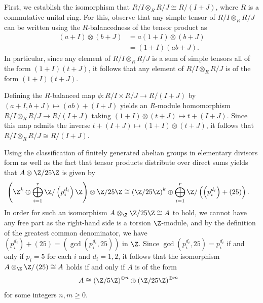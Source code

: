 \documentclass[10pt]{mypackage}
\begin{document}
\begin{solution}
  First, we establish the isomorphism that $R/I\otimes_{R}R/J\cong R/\left( I + J \right)$, where $R$ is a commutative unital ring. For this, observe that any simple tensor of $R/I\otimes_R R/J$ can be written using the $R$-balancedness of the tensor product as
  \begin{align*}
    \left( a + I \right)\otimes \left( b + J \right) &= a\left( 1 + I \right)\otimes \left( b + J \right)\\
                                                     &= \left( 1 + I \right)\left( ab + J \right).
  \end{align*}
  In particular, since any element of $R/I\otimes_{R}R/J$ is a sum of simple tensors all of the form $\left( 1 + I \right)\left( t + J \right)$, it follows that any element of $R/I\otimes_{R}R/J$ is of the form $\left( 1 + I \right)\left( t + J \right)$.

  Defining the $R$-balanced map $\phi\colon R/I\times R/J\rightarrow R/\left(  I +J \right)$ by $\left( a + I,b+J \right)\mapsto \left( ab \right) + \left( I+J \right)$ yields an $R$-module homomorphism $R/I\otimes_{R}R/J\rightarrow R/\left( I + J \right)$ taking $\left( 1 + I \right)\otimes \left( t + J \right)\mapsto t + \left( I+J \right)$. Since this map admits the inverse $t + \left(  I +J \right)\mapsto \left( 1+I \right)\otimes \left( t + J \right)$, it follows that $R/I\otimes_{R}R/J\cong R/\left( I + J \right)$.

  Using the classification of finitely generated abelian groups in elementary divisors form as well as the fact that tensor products distribute over direct sums yields that $A\otimes \Z/25\Z$ is given by
  \begin{align*}
    \left( \Z^{k}\oplus \bigoplus_{i=1}^{r}\Z/\left( p_i^{d_i} \right)\Z \right)\otimes \Z/25\Z &\cong \left( \Z/25\Z \right)^{k} \oplus \bigoplus_{i=1}^{r} \Z/\left( \left( p_i^{d_i} \right) + \left( 25 \right) \right).
  \end{align*}
  In order for such an isomorphism $A\otimes_{\Z}\Z/25\Z\cong A$ to hold, we cannot have any free part as the right-hand side is a torsion $\Z$-module, and by the definition of the greatest common denominator, we have $\left( p_i^{d_i} \right) + \left( 25 \right) = \left( \gcd\left( p_i^{d_i},25 \right) \right)$ in $\Z$. Since $\gcd\left( p_i^{d_i},25 \right) = p_i^{d_i}$ if and only if $p_i = 5$ for each $i$ and $d_i = 1,2$, it follows that the isomorphism $A\otimes_{\Z}\Z/\left( 25 \right)\cong A$ holds if and only if $A$ is of the form
  \begin{align*}
    A &\cong \left( \Z/5\Z \right)^{\oplus n}\oplus \left( \Z/25\Z \right)^{\oplus m}
  \end{align*}
  for some integers $n,m\geq 0$.
\end{solution}
\end{document}
